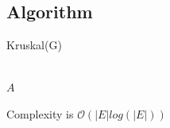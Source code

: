 \documentclass[a4paper,12pt,hidelinks]{article}
\newcommand{\Card}[1]{\left\lvert#1\right\rvert}
\newcommand{\Oh}[1]{\mathcal{O}\left(#1\right)}
\newcommand{\Union}{\cup}
\begin{document}
	\subsection{Algorithm}

	\begin{algorithm}[H]
		\caption{Kruskal(G)}
		\begin{algorithmic}[1]
			\EndFor
					\State{$A \Union (u,v)$}
				\EndIf
			\EndFor\\
			\Return $A$
		\end{algorithmic}
	\end{algorithm}
	Complexity is $\Oh{\Card{E}log(\Card{E})}$

\pagebreak 

\printbibliography
\end{document}
